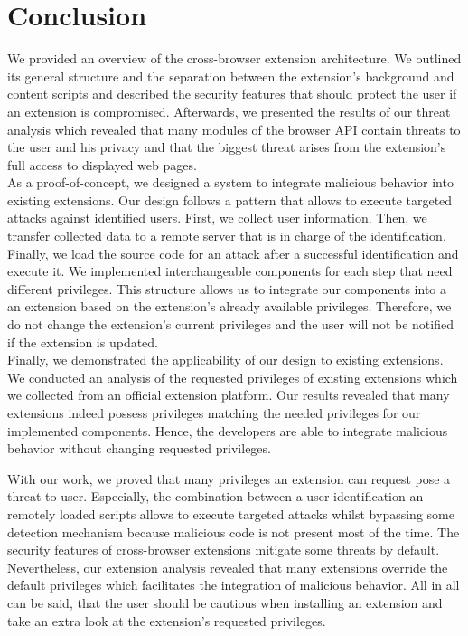 
\chapter{Conclusion}
\label{chp:conclusion}

	We provided an overview of the cross-browser extension architecture. We outlined its general structure and the separation between the extension's background and content scripts and described the security features that should protect the user if an extension is compromised. Afterwards, we presented the results of our threat analysis which revealed that many modules of the browser API contain threats to the user and his privacy and that the biggest threat arises from the extension's full access to displayed web pages.\\
	As a proof-of-concept, we designed a system to integrate malicious behavior into existing extensions. Our design follows a pattern that allows to execute targeted attacks against identified users. First, we collect user information. Then, we transfer collected data to a remote server that is in charge of the identification. Finally, we load the source code for an attack after a successful identification and execute it. We implemented interchangeable components for each step that need different privileges. This structure allows us to integrate our components into a an extension based on the extension's already available privileges. Therefore, we do not change the extension's current privileges and the user will not be notified if the extension is updated. \\
	Finally, we demonstrated the applicability of our design to existing extensions. We conducted an analysis of the requested privileges of existing extensions which we collected from an official extension platform. Our results revealed that many extensions indeed possess privileges matching the needed privileges for our implemented components. Hence, the developers are able to integrate malicious behavior without changing requested privileges.
	
	With our work, we proved that many privileges an extension can request pose a threat to user. Especially, the combination between a user identification an remotely loaded scripts allows to execute targeted attacks whilst bypassing some detection mechanism because malicious code is not present most of the time. The security features of cross-browser extensions mitigate some threats by default. Nevertheless, our extension analysis revealed that many extensions override the default privileges which facilitates the integration of malicious behavior. All in all can be said, that the user should be cautious when installing an extension and take an extra look at the extension's requested privileges.